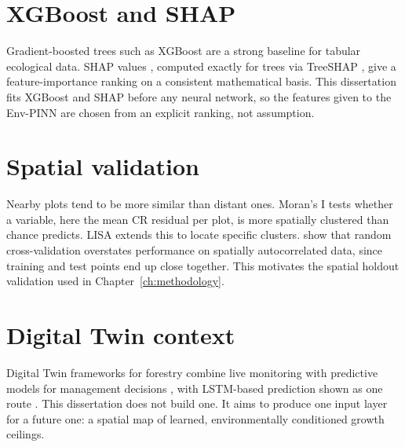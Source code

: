 \section{XGBoost and SHAP}

Gradient-boosted trees such as XGBoost \citep{chen2016XGBoostScalableTree} are a strong baseline for tabular ecological data. SHAP values \citep{lundberg2017UnifiedApproachInterpreting}, computed exactly for trees via TreeSHAP \citep{lundberg2020LocalExplanationsGlobal}, give a feature-importance ranking on a consistent mathematical basis. This dissertation fits XGBoost and SHAP before any neural network, so the features given to the Env-PINN are chosen from an explicit ranking, not assumption.

\section{Spatial validation}

Nearby plots tend to be more similar than distant ones. Moran's I \citep{moran1950NotesContinuousStochastic} tests whether a variable, here the mean CR residual per plot, is more spatially clustered than chance predicts. LISA \citep{anselin1995LocalIndicatorsSpatial} extends this to locate specific clusters. \citet{roberts2017CrossvalidationStrategiesData} show that random cross-validation overstates performance on spatially autocorrelated data, since training and test points end up close together. This motivates the spatial holdout validation used in Chapter~\ref{ch:methodology}.

\section{Digital Twin context}

Digital Twin frameworks for forestry combine live monitoring with predictive models for management decisions \citep{buonocore2022ProposalForestDigital}, with LSTM-based prediction shown as one route \citep{jiang2022DigitalTwinForest}. This dissertation does not build one. It aims to produce one input layer for a future one: a spatial map of learned, environmentally conditioned growth ceilings.
